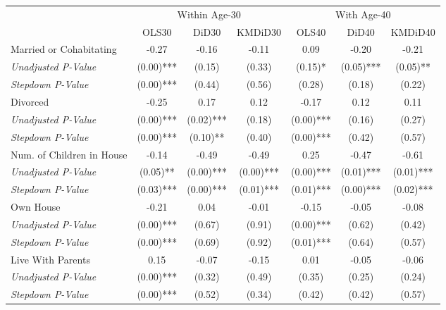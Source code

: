 \begin{tabular}{l c c c c c c}
\toprule
& \multicolumn{3}{c}{Within Age-30} & \multicolumn{3}{c}{With Age-40} \\\cmidrule(lr){2-4} \cmidrule(lr){5-7}
 & OLS30 & DiD30 & KMDiD30 & OLS40 & DiD40 & KMDiD40 \\
\midrule
Married or Cohabitating & -0.27 & -0.16 & -0.11 & 0.09 & -0.20 & -0.21 \\
\quad \textit{Unadjusted P-Value} & (0.00)*** & (0.15) & (0.33) & (0.15)* & (0.05)*** & (0.05)** \\
\quad \textit{Stepdown P-Value} & (0.00)*** & (0.44) & (0.56) & (0.28) & (0.18) & (0.22) \\
Divorced & -0.25 & 0.17 & 0.12 & -0.17 & 0.12 & 0.11 \\
\quad \textit{Unadjusted P-Value} & (0.00)*** & (0.02)*** & (0.18) & (0.00)*** & (0.16) & (0.27) \\
\quad \textit{Stepdown P-Value} & (0.00)*** & (0.10)** & (0.40) & (0.00)*** & (0.42) & (0.57) \\
Num. of Children in House & -0.14 & -0.49 & -0.49 & 0.25 & -0.47 & -0.61 \\
\quad \textit{Unadjusted P-Value} & (0.05)** & (0.00)*** & (0.00)*** & (0.00)*** & (0.01)*** & (0.01)*** \\
\quad \textit{Stepdown P-Value} & (0.03)*** & (0.00)*** & (0.01)*** & (0.01)*** & (0.00)*** & (0.02)*** \\
Own House & -0.21 & 0.04 & -0.01 & -0.15 & -0.05 & -0.08 \\
\quad \textit{Unadjusted P-Value} & (0.00)*** & (0.67) & (0.91) & (0.00)*** & (0.62) & (0.42) \\
\quad \textit{Stepdown P-Value} & (0.00)*** & (0.69) & (0.92) & (0.01)*** & (0.64) & (0.57) \\
Live With Parents & 0.15 & -0.07 & -0.15 & 0.01 & -0.05 & -0.06 \\
\quad \textit{Unadjusted P-Value} & (0.00)*** & (0.32) & (0.49) & (0.35) & (0.25) & (0.24) \\
\quad \textit{Stepdown P-Value} & (0.00)*** & (0.52) & (0.34) & (0.42) & (0.42) & (0.57) \\
\bottomrule
\end{tabular}
